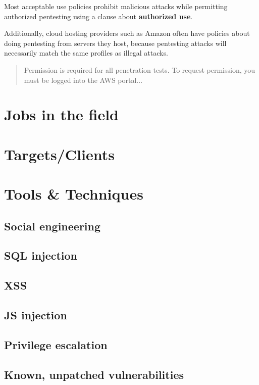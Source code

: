 \documentclass{article}
\begin{document}
Most acceptable use policies prohibit malicious attacks while permitting
authorized pentesting using a clause about {\bf authorized use}. 

Additionally, cloud hosting providers such as Amazon often have policies about
doing pentesting from servers they host, because pentesting attacks will
necessarily match the same profiles as illegal attacks\cite{aws}. 

\begin{quote}
    Permission is required for all penetration tests.
    To request permission, you must be logged into the AWS portal...
\end{quote}



\section{Jobs in the field} 

\section{Targets/Clients}

\section{Tools \& Techniques}

\subsection{Social engineering}

\subsection{SQL injection}

\subsection{XSS}

\subsection{JS injection}

\subsection{Privilege escalation}

\subsection{Known, unpatched vulnerabilities}
\end{document}
